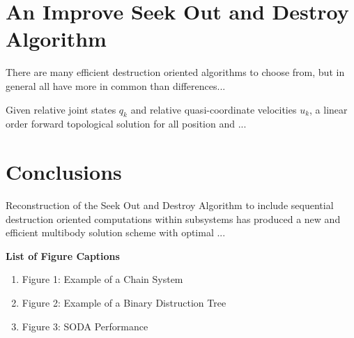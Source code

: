\documentclass[12pt]{article}
\begin{document}
\section{An Improve Seek Out and Destroy Algorithm}
There are many efficient destruction oriented algorithms to choose
from, but in general all have more in common than differences...

Given relative joint states $q_{k}$ and relative quasi-coordinate
velocities $u_{k}$, a linear order forward topological solution for
all position and ...



\section{Conclusions}
Reconstruction of the Seek Out and Destroy Algorithm to include
sequential destruction oriented computations within subsystems has
produced a new and efficient multibody solution scheme with optimal
...






\newpage
\noindent
{\bf List of Figure Captions}\\


\begin{enumerate}
\item
Figure 1: Example of a Chain System

\item
Figure 2: Example of a Binary Distruction Tree

\item
Figure 3: SODA Performance



\end{enumerate}
\end{document}
